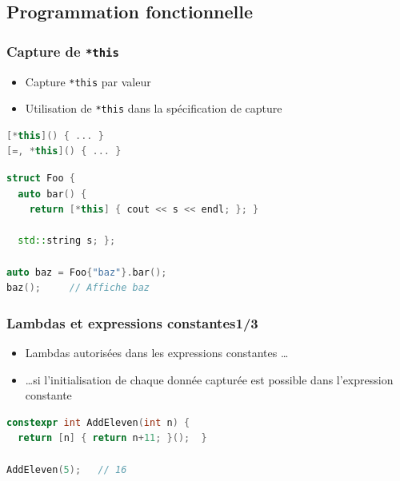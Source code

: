 \documentclass[C++.tex]{subfiles}
\begin{document}
\subsection*{Programmation fonctionnelle}
\begin{frame}[fragile]
	\frametitle{Capture de \lstinline|*this|}
	\begin{itemize}
		\item Capture \lstinline|*this| par valeur
		\item Utilisation de \lstinline|*this| dans la spécification de capture

	\end{itemize}

	\begin{lstlisting}[language=C++]
[*this]() { ... }
[=, *this]() { ... }\end{lstlisting}

	\begin{lstlisting}[language=C++]
struct Foo {
  auto bar() {
    return [*this] { cout << s << endl; }; }

  std::string s; };

auto baz = Foo{"baz"}.bar();
baz();     // Affiche baz\end{lstlisting}

\end{frame}

\begin{frame}[fragile]
	\frametitle{Lambdas et expressions constantes\titlehfill{}1/3}
	\begin{itemize}
		\item Lambdas autorisées dans les expressions constantes \ldots
		\item \ldots{}si l'initialisation de chaque donnée capturée est possible dans l'expression constante
	\end{itemize}

	\begin{lstlisting}[language=C++]
constexpr int AddEleven(int n) {
  return [n] { return n+11; }();  }

AddEleven(5);   // 16\end{lstlisting}
\end{frame}
\end{document}
